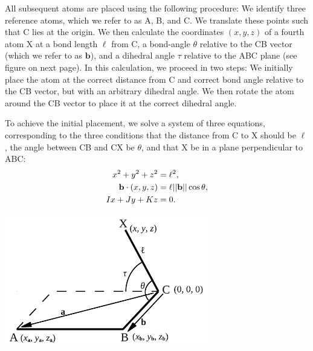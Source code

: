 \documentclass[12pt]{article}
\begin{document}
All subsequent atoms are placed using the following procedure: We identify three reference atoms, which we refer to as A, B, and C. We translate these points such that C lies at the origin. We then calculate the coordinates $(x, y, z)$ of a fourth atom X at a bond length $\ell$ from C, a bond-angle $\theta$ relative to the CB vector (which we refer to as $\mathbf{b}$), and a dihedral angle $\tau$ relative to the ABC plane (see figure on next page). In this calculation, we proceed in two steps: We initially place the atom at the correct distance from C and correct bond angle relative to the CB vector, but with an arbitrary dihedral angle. We then rotate the atom around the CB vector to place it at the correct dihedral angle.

To achieve the initial placement, we solve a system of three equations, corresponding to the three conditions that the distance from C to X should be $\ell$, the angle between CB and CX be $\theta$, and that X be in a plane perpendicular to ABC:
\begin{align}
x^2 + y^2 + z^2 &= \ell^2, \label{eq:dist}\\
{\bf b} \cdot (x,y,z) &= \ell  ||{\bf b}|| \cos{\theta}, \label{eq:angle}\\
Ix + Jy +Kz &=0. \label{eq:plane}
\end{align}

\centerline{\includegraphics[width=3.5in]{figures/atom_placement}}
\bigskip
\end{document}
